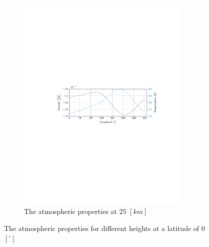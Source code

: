 \begin{figure}[h]
\begin{subfigure}{0.9\textwidth}
	\includegraphics[trim={4.5cm 11cm 3.1cm 11cm},clip,width=0.9\textwidth]{Figure/atmos_model/lon_25.pdf}
	\caption{The atmospheric properties at $25$ $\left[km\right]$} 
	\label{fig:atmos_lon_25}
	\end{subfigure}
	\caption{The atmospheric properties for different heights at a latitude of 0 $\left[^\circ\right]$}
	\label{fig:atmos_lon}
\end{figure}

